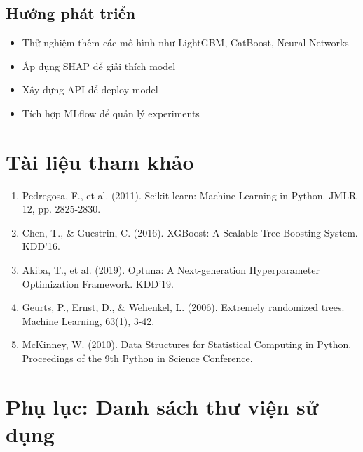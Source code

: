 \documentclass[12pt,a4paper]{article}
\begin{document}
\subsection{Hướng phát triển}

\begin{itemize}
    \item Thử nghiệm thêm các mô hình như LightGBM, CatBoost, Neural Networks
    \item Áp dụng SHAP để giải thích model
    \item Xây dựng API để deploy model
    \item Tích hợp MLflow để quản lý experiments
\end{itemize}

\section*{Tài liệu tham khảo}

\begin{enumerate}
    \item Pedregosa, F., et al. (2011). Scikit-learn: Machine Learning in Python. JMLR 12, pp. 2825-2830.
    
    \item Chen, T., \& Guestrin, C. (2016). XGBoost: A Scalable Tree Boosting System. KDD'16.
    
    \item Akiba, T., et al. (2019). Optuna: A Next-generation Hyperparameter Optimization Framework. KDD'19.
    
    \item Geurts, P., Ernst, D., \& Wehenkel, L. (2006). Extremely randomized trees. Machine Learning, 63(1), 3-42.
    
    \item McKinney, W. (2010). Data Structures for Statistical Computing in Python. Proceedings of the 9th Python in Science Conference.
\end{enumerate}

\appendix
\section{Phụ lục: Danh sách thư viện sử dụng}
\end{document}
